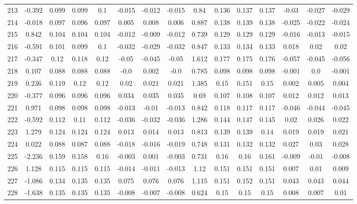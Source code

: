 \begin{table}[H]
{\begin{tabular}{l|c|ccc|ccc|c|ccc|ccc}
			213 & -0.392 & 0.099 & 0.099 & 0.1 & -0.015 & -0.012 & -0.015 & 0.84 & 0.136 & 0.137 & 0.137 & -0.03 & -0.027 & -0.029 \\
			214 & -0.018 & 0.097 & 0.096 & 0.097 & 0.005 & 0.008 & 0.006 & 0.887 & 0.138 & 0.139 & 0.138 & -0.025 & -0.022 & -0.024 \\
			215 & 0.842 & 0.104 & 0.104 & 0.104 & -0.012 & -0.009 & -0.012 & 0.739 & 0.129 & 0.129 & 0.129 & -0.016 & -0.013 & -0.015 \\
			216 & -0.591 & 0.101 & 0.099 & 0.1 & -0.032 & -0.029 & -0.032 & 0.847 & 0.133 & 0.134 & 0.133 & 0.018 & 0.02 & 0.02 \\
			217 & -0.347 & 0.12 & 0.118 & 0.12 & -0.05 & -0.045 & -0.05 & 1.612 & 0.177 & 0.175 & 0.176 & -0.057 & -0.045 & -0.056 \\
			218 & 0.107 & 0.088 & 0.088 & 0.088 & -0.0 & 0.002 & -0.0 & 0.785 & 0.098 & 0.098 & 0.098 & -0.001 & 0.0 & -0.001 \\
			219 & 0.236 & 0.119 & 0.12 & 0.12 & 0.02 & 0.021 & 0.021 & 1.385 & 0.15 & 0.151 & 0.15 & 0.002 & 0.005 & 0.004 \\
			220 & -0.377 & 0.096 & 0.096 & 0.096 & 0.034 & 0.035 & 0.035 & 0.69 & 0.107 & 0.108 & 0.107 & 0.012 & 0.012 & 0.013 \\
			221 & 0.971 & 0.098 & 0.098 & 0.098 & -0.013 & -0.01 & -0.013 & 0.842 & 0.118 & 0.117 & 0.117 & -0.046 & -0.044 & -0.045 \\
			222 & -0.592 & 0.112 & 0.11 & 0.112 & -0.036 & -0.032 & -0.036 & 1.286 & 0.144 & 0.147 & 0.145 & 0.02 & 0.026 & 0.022 \\
			223 & 1.279 & 0.124 & 0.124 & 0.124 & 0.013 & 0.014 & 0.013 & 0.813 & 0.139 & 0.139 & 0.14 & 0.019 & 0.019 & 0.021 \\
			224 & 0.022 & 0.088 & 0.087 & 0.088 & -0.018 & -0.016 & -0.019 & 0.748 & 0.131 & 0.132 & 0.132 & 0.027 & 0.03 & 0.028 \\
			225 & -2.236 & 0.159 & 0.158 & 0.16 & -0.003 & 0.001 & -0.003 & 0.731 & 0.16 & 0.16 & 0.161 & -0.009 & -0.01 & -0.008 \\
			226 & 1.128 & 0.115 & 0.115 & 0.115 & -0.014 & -0.011 & -0.013 & 1.12 & 0.151 & 0.151 & 0.151 & 0.007 & 0.01 & 0.009 \\
			227 & -1.086 & 0.134 & 0.135 & 0.135 & 0.075 & 0.076 & 0.076 & 1.115 & 0.151 & 0.152 & 0.151 & 0.043 & 0.043 & 0.044 \\
			228 & -1.638 & 0.135 & 0.135 & 0.135 & -0.008 & -0.007 & -0.008 & 0.624 & 0.15 & 0.15 & 0.15 & 0.008 & 0.007 & 0.01 \\

\end{tabular}}
\end{table}
